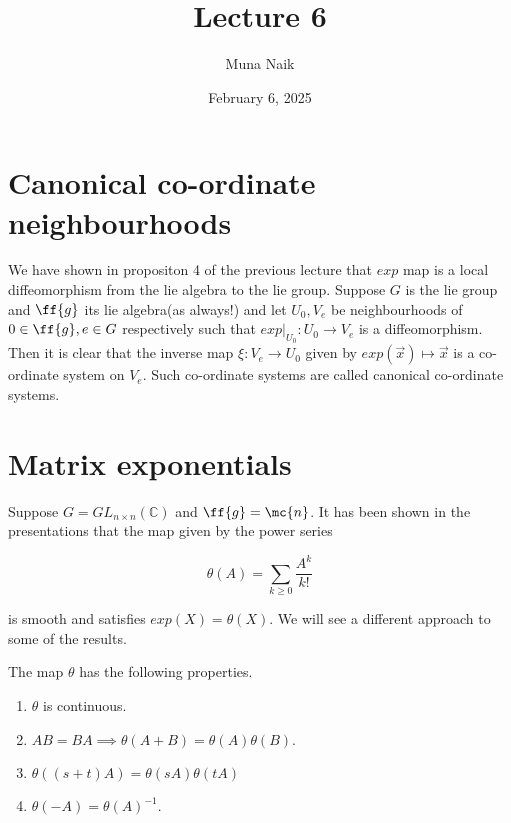 \documentclass{article}
\title{Lecture 6}
\date{February 6, 2025}
\author{Muna Naik}
\newcommand*{\glcg}[1]{GL_{#1 \times #1}(\mathbb{C})}
\begin{document}
\maketitle

\section*{Canonical co-ordinate neighbourhoods}

We have shown in propositon 4 of the previous lecture that $exp$ map is a local diffeomorphism from the lie algebra to the lie group.
Suppose $G$ is the lie group and $\ff{g}$ its lie algebra(as always!) and let $U_0,V_e$ be neighbourhoods of $0\in \ff{g},e\in G$ respectively such that $exp|_{U_0}:U_0\to V_e$ is a diffeomorphism.
Then it is clear that the inverse map $\xi:V_e\to U_0$ given by $exp(\vec{x})\mapsto \vec{x}$ is a co-ordinate system on $V_e$. Such co-ordinate systems are called canonical co-ordinate systems.

\section*{Matrix exponentials}

Suppose $G = \glcg{n}$ and $\ff{g} = \mc{n}$. It has been shown in the presentations that the map given by the power series

$$\theta(A) = \sum_{k\geq 0}\frac{A^k}{k!}$$

is smooth and satisfies $exp(X) = \theta(X)$. We will see a different approach to some of the results.

\begin{proposition}
    The map $\theta$ has the following properties.
    \begin{enumerate}
        \item $\theta$ is continuous.
        \item $AB=BA\implies \theta(A+B) = \theta(A)\theta(B)$.
        \item $\theta((s+t)A) = \theta(sA)\theta(tA)$
        \item $\theta(-A) = \theta(A)^{-1}$.
    \end{enumerate}
\end{proposition}
\end{document}
